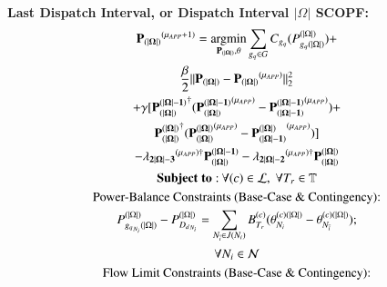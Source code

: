 \documentclass[preprint,12pt,3p]{elsarticle}
\begin{document}
\textbf{Last Dispatch Interval, or Dispatch Interval $|\Omega|$ SCOPF:}
\begin{subequations}\label{Look-Ahead_General_Third_Interval_Angle}
\begin{gather}
\mathbf{P_{(|\Omega|)}}^{(\mu_{APP}+1)}= \argmin_{\mathbf{P_{(|\Omega|)}},\theta} \sum_{{g_q}\in G}C_{g_q}(P_{{g_q}(|\Omega|)}^{(|\Omega|)})+\notag\\ \frac{\beta}{2}||\mathbf{P_{(|\Omega|)}}-\mathbf{P_{(|\Omega|)}}^{(\mu_{APP})}||_2^2\notag\\+ \gamma[\mathbf{P_{(|\Omega|)}^{(|\Omega|-1)}}^{\dagger}(\mathbf{P_{(|\Omega|)}^{(|\Omega|-1)}}^{(\mu_{APP})}-\mathbf{P_{(|\Omega|-1)}^{(|\Omega|-1)}}^{(\mu_{APP})})+\notag\\\mathbf{P_{(|\Omega|)}^{(|\Omega|)}}^{\dagger}(\mathbf{P_{(|\Omega|)}^{(|\Omega|)}}^{(\mu_{APP})}-\mathbf{P_{(|\Omega|-1)}^{(|\Omega|)}}^{(\mu_{APP})})]\notag\\- \mathbf{\lambda_{2|\Omega|-3}}^{(\mu_{APP})\dagger}\mathbf{P_{(|\Omega|)}^{(|\Omega|-1)}}-\mathbf{\lambda_{2|\Omega|-2}}^{(\mu_{APP})\dagger}\mathbf{P_{(|\Omega|)}^{(|\Omega|)}}\label{first_Look-Ahead_General_Third_Interval_Angle}\\
\mathbf{Subject\;to:}\:\forall(c)\in\mathcal{L},\;\forall T_r\in \mathbb{T}\notag\\
\text{Power-Balance Constraints (Base-Case \& Contingency):}\notag\\
P_{{g_q}_{N_i}(|\Omega|)}^{(|\Omega|)}-P_{{D_d}_{N_i}}^{(|\Omega|)}=\sum_{N_{\overline{i}}\in{J(N_i)}}B_{T_r}^{(c)}(\theta_{N_i}^{(c)(|\Omega|)}-\theta_{N_{\overline{i}}}^{(c)(|\Omega|)});\notag\\\forall{{N_i}\in\mathcal{N}}\label{secondA_Look-Ahead_General_Third_Interval_Angle}\\
\text{Flow Limit Constraints (Base-Case \& Contingency):}\notag\\

\end{gather}
\end{subequations}
\end{document}

